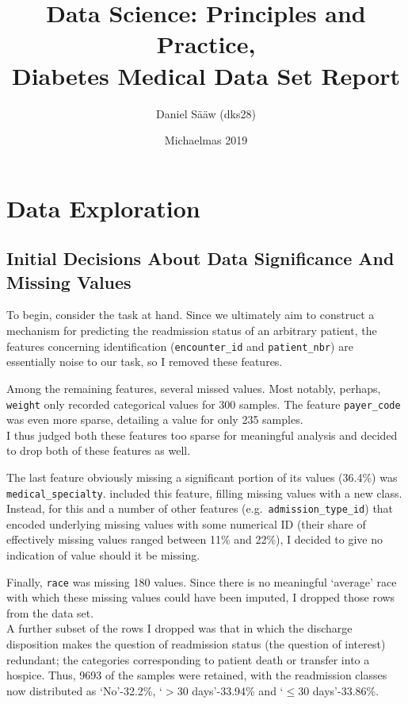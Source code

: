 \documentclass[10pt, twoside, a4paper]{article}
\author{Daniel Sääw (dks28)}
\title{Data Science: Principles and Practice,\\ Diabetes Medical Data Set Report}
\date{Michaelmas 2019}
\begin{document}
	\let\originalnewpage\newpage
	\let\newpage\relax
	\maketitle
	\let\newpage\originalnewpage

	\section{Data Exploration}

	\subsection{Initial Decisions About Data Significance And Missing Values}

	To begin, consider the task at hand. Since we 
	ultimately aim to construct a mechanism for predicting the readmission status of an 
	arbitrary patient, the features concerning  identification (\texttt{encounter\_id} and 
	\texttt{patient\_nbr}) are essentially noise to our task, so 
	I removed these features.

	Among the remaining features, several  missed values.
	Most notably, perhaps, \texttt{weight} only recorded categorical values for 300 samples. 
	The feature \texttt{payer\_code} was even more sparse, detailing a value for only 235 samples. \\
	I thus judged both these features too sparse for meaningful analysis and decided 
	to drop both of these features as well.  

	The last feature obviously missing a significant portion of its values (36.4\%) was 
	\texttt{medical\_specialty}. \cite{Strack2014} 
	included this feature, filling missing values with a new class. Instead, for this and a 
	number of other features (e.g.\ \texttt{admission\_type\_id}) that encoded underlying 
	missing values with some numerical ID (their share of effectively  missing values ranged 
	between 11\% and 22\%), I 
	decided to give no indication of value should it be missing.   

	Finally, \texttt{race} was missing 180 values. Since there is no meaningful 
	`average' race with which these missing values could have been imputed, I dropped those 
	rows from the data set. \\
	A further subset of the rows I dropped was that in which the
	discharge disposition makes the question of readmission status (the question of interest)
	redundant; the categories 
	corresponding to patient death or 
	transfer into a hospice. Thus, 9693 of
	the samples were retained, with the readmission classes now distributed as `No'-32.2\%, 
	`$> 30$ days'-33.94\% and `$\leq 30$ days'-33.86\%. 
\end{document}
